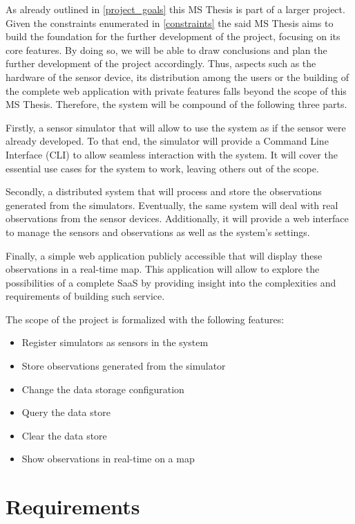 As already outlined in \ref{project_goals} this MS Thesis is part of a larger project. Given the constraints enumerated in \ref{constraints} the said MS Thesis aims to build the foundation for the further development of the project, focusing on its core features. By doing so, we will be able to draw conclusions and plan the further development of the project accordingly. Thus, aspects such as the hardware of the sensor device, its distribution among the users or the building of the complete web application with private features falls beyond the scope of this MS Thesis. Therefore, the system will be compound of the following three parts. 

Firstly, a sensor simulator that will allow to use the system as if the sensor were already developed. To that end, the simulator will provide a Command Line Interface (CLI) to allow seamless interaction with the system. It will cover the essential use cases for the system to work, leaving others out of the scope.

Secondly, a distributed system that will process and store the observations generated from the simulators. Eventually, the same system will deal with real observations from the sensor devices. Additionally, it will provide a web interface to manage the sensors and observations as well as the system's settings.

Finally, a simple web application publicly accessible that will display these observations in a real-time map. This application will allow to explore the possibilities of a complete SaaS by providing insight into the complexities and requirements of building such service.

The scope of the project is formalized with the following features:

\begin{itemize}
\item Register simulators as sensors in the system
\item Store observations generated from the simulator
\item Change the data storage configuration
\item Query the data store
\item Clear the data store
\item Show observations in real-time on a map
\end{itemize}

\section{Requirements}

